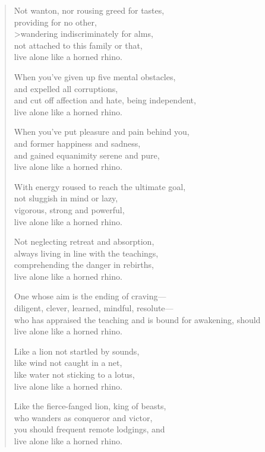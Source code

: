 \documentclass[12pt,openany]{book}%
\begin{document}
\begin{verse}
Not wanton, nor rousing greed for tastes, \\
providing for no other, \\>wandering indiscriminately for alms, \\
not attached to this family or that, \\
live alone like a horned rhino. 

When you’ve given up five mental obstacles, \\
and expelled all corruptions, \\
and cut off affection and hate, being independent, \\
live alone like a horned rhino. 

When you’ve put pleasure and pain behind you, \\
and former happiness and sadness, \\
and gained equanimity serene and pure, \\
live alone like a horned rhino. 

With energy roused to reach the ultimate goal, \\
not sluggish in mind or lazy, \\
vigorous, strong and powerful, \\
live alone like a horned rhino. 

Not neglecting retreat and absorption, \\
always living in line with the teachings, \\
comprehending the danger in rebirths, \\
live alone like a horned rhino. 

One whose aim is the ending of craving—\\
diligent, clever, learned, mindful, resolute—\\
who has appraised the teaching and is bound for awakening, should \\
live alone like a horned rhino. 

Like a lion not startled by sounds, \\
like wind not caught in a net, \\
like water not sticking to a lotus, \\
live alone like a horned rhino. 

Like the fierce-fanged lion, king of beasts, \\
who wanders as conqueror and victor, \\
you should frequent remote lodgings, and \\
live alone like a horned rhino. 


\end{verse}
\end{document}
